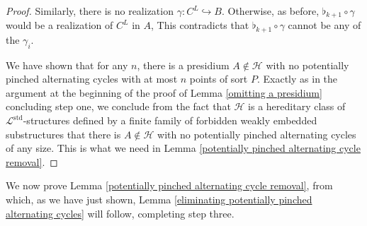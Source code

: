 \documentclass{amsart}
\theoremstyle{definition}
\theoremstyle{remark}
\numberwithin{equation}{section}
\begin{document}
\begin{proof}
Similarly, there is no realization $\gamma: C^{L} \hookrightarrow B$. Otherwise, as before, $\flat_{k+1} \circ \gamma$ would be a realization of $C^{L}$ in $A$, This contradicts that $\flat_{k+1} \circ \gamma$ cannot be any of the $\gamma_{i}$.

We have shown that for any $n$, there is a presidium $A \notin \mathcal{H}$ with no potentially pinched alternating cycles with at most $n$ points of sort $P$. Exactly as in the argument at the beginning of the proof of Lemma \ref{omitting a presidium} concluding step one, we conclude from the fact that $\mathcal{H}$ is a hereditary class of $\mathcal{L}^{\mathrm{std}}$-structures defined by a finite family of forbidden weakly embedded substructures that there is $A \notin \mathcal{H}$ with no potentially pinched alternating cycles of any size. This is what we need in Lemma \ref{potentially pinched alternating cycle removal}.

\end{proof}

We now prove Lemma \ref{potentially pinched alternating cycle removal}, from which, as we have just shown, Lemma \ref{eliminating potentially pinched alternating cycles} will follow, completing step three.
\end{document}
